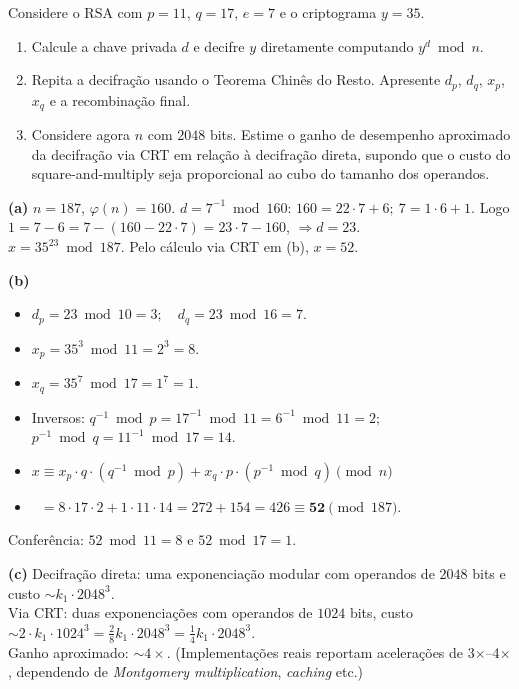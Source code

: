 \documentclass[12pt,a4paper]{article}
\begin{document}
\begin{exercicio}
Considere o RSA com $p = 11$, $q = 17$, $e = 7$ e o criptograma $y = 35$.
\begin{enumerate}[label=(\alph*)]
    \item Calcule a chave privada $d$ e decifre $y$ diretamente computando $y^{d} \bmod n$.
    \item Repita a decifra\c{c}\~{a}o usando o Teorema Chin\^{e}s do Resto. Apresente $d_p$, $d_q$, $x_p$, $x_q$ e a recombina\c{c}\~{a}o final.
    \item Considere agora $n$ com $2048$ bits. Estime o ganho de desempenho aproximado da decifra\c{c}\~{a}o via CRT em rela\c{c}\~{a}o \`{a} decifra\c{c}\~{a}o direta, supondo que o custo do square-and-multiply seja proporcional ao cubo do tamanho dos operandos.
\end{enumerate}

\begin{resposta}
\textbf{(a)} $n = 187$, $\varphi(n) = 160$. $d = 7^{-1} \bmod 160$: $160 = 22 \cdot 7 + 6;\ 7 = 1 \cdot 6 + 1$. Logo $1 = 7 - 6 = 7 - (160 - 22 \cdot 7) = 23 \cdot 7 - 160$, $\Rightarrow d = 23$. \\
$x = 35^{23} \bmod 187$. Pelo c\'{a}lculo via CRT em (b), $x = 52$.

\textbf{(b)}
\begin{itemize}[leftmargin=1.4em,topsep=2pt,itemsep=1pt]
    \item $d_p = 23 \bmod 10 = 3;\quad d_q = 23 \bmod 16 = 7.$
    \item $x_p = 35^{3} \bmod 11 = 2^{3} = 8.$
    \item $x_q = 35^{7} \bmod 17 = 1^{7} = 1.$
    \item Inversos: $q^{-1} \bmod p = 17^{-1} \bmod 11 = 6^{-1} \bmod 11 = 2$;\ $p^{-1} \bmod q = 11^{-1} \bmod 17 = 14.$
    \item $x \equiv x_p \cdot q \cdot (q^{-1} \bmod p) + x_q \cdot p \cdot (p^{-1} \bmod q) \pmod{n}$
    \item $\phantom{x} = 8 \cdot 17 \cdot 2 + 1 \cdot 11 \cdot 14 = 272 + 154 = 426 \equiv \mathbf{52} \pmod{187}.$
\end{itemize}
Confer\^{e}ncia: $52 \bmod 11 = 8$ e $52 \bmod 17 = 1$. \checkmark

\textbf{(c)} Decifra\c{c}\~{a}o direta: uma exponencia\c{c}\~{a}o modular com operandos de $2048$ bits e custo $\sim k_1 \cdot 2048^{3}$. \\
Via CRT: duas exponencia\c{c}\~{o}es com operandos de $1024$ bits, custo $\sim 2 \cdot k_1 \cdot 1024^{3} = \tfrac{2}{8} k_1 \cdot 2048^{3} = \tfrac{1}{4} k_1 \cdot 2048^{3}$. \\
Ganho aproximado: \textbf{$\sim 4\times$}. (Implementa\c{c}\~{o}es reais reportam acelera\c{c}\~{o}es de 3$\times$--4$\times$, dependendo de \emph{Montgomery multiplication}, \emph{caching} etc.)
\end{resposta}
\end{exercicio}
\end{document}
